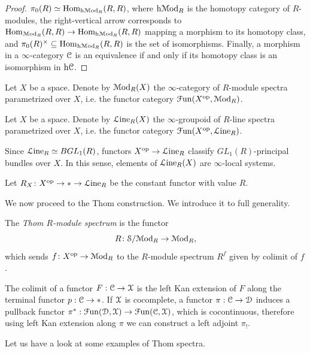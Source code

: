 \documentclass[10pt]{amsart}
\begin{document}
\begin{proof}
	$\pi_0(R)\simeq\mathrm{Hom}_{\mathrm{h}\mathcal{M}\mathrm{od}_R}(R,R)$, where $\mathrm{h}\mathcal{M}\mathrm{od}_R$ is the homotopy category of $R$-modules, the right-vertical arrow corresponds to $\mathrm{Hom}_{\mathcal{M}\mathrm{od}_R}(R,R)\to\mathrm{Hom}_{\mathrm{h}\mathcal{M}\mathrm{od}_R}(R,R)$ mapping a morphism to its homotopy class, and $\pi_0(R)^\times\subseteq\mathrm{Hom}_{\mathrm{h}\mathcal{M}\mathrm{od}_R}(R,R)$ is the set of isomorphisms. Finally, a morphism in a $\infty$-category $\mathcal{C}$ is an equivalence if and only if its homotopy class is an isomorphism in $\mathrm{h}\mathcal{C}$. 
\end{proof}
\begin{definition}
	Let $X$ be a space. Denote by $\mathcal{M}\mathrm{od}_R(X)$ the $\infty$-category of $R$-module spectra parametrized over $X$, i.e. the functor category $\mathcal{F}\mathrm{un}(X^{\mathrm{op}},\mathcal{M}\mathrm{od}_R)$.
\end{definition}

\begin{definition}
	Let $X$ be a space. Denote by $\mathcal{L}\mathrm{ine}_R(X)$ the $\infty$-groupoid of $R$-line spectra parametrized over $X$, i.e. the functor category $\mathcal{F}\mathrm{un}(X^{\mathrm{op}},\mathcal{L}\mathrm{ine}_R)$. 
\end{definition}
Since $\mathcal{L}\mathrm{ine}_R\simeq BGL_1(R)$, functors $X^{\mathrm{op}}\to\mathcal{L}\mathrm{ine}_R$ classify $GL_1(R)$-principal bundles over $X$. In this sense, elements of $\mathcal{L}\mathrm{ine}_R(X)$ are $\infty$-local systems. 
\begin{example}
	Let $R_X\colon X^{\mathrm{op}} \to*\to \mathcal{L}\mathrm{ine}_R$ be the constant functor with value $R$. 
\end{example}
We now proceed to the Thom construction. We introduce it to full generality. 
\begin{definition} \label{def:thom}
	The \emph{Thom $R$-module spectrum} is the functor
	\[
	R \colon \mathcal{S}/\mathcal{M}\mathrm{od}_R \to \mathcal{M}\mathrm{od}_R,
	\]
	which sends $f\colon X^{\mathrm{op}} \to \mathcal{M}\mathrm{od}_R$ to the $R$-module spectrum $R^f$ given by colimit of $f$. 
\end{definition}
\begin{remark}The colimit of a functor $F:\mathcal{C}\to\mathcal{X}$ is the left Kan extension of $F$ along the terminal functor $p:\mathcal{C}\to*$. If $\mathcal{X}$ is cocomplete, a functor $\pi:\mathcal{C}\to\mathcal{D}$ induces a pullback functor $\pi^*:\mathcal{F}\mathrm{un}(\mathcal{D},\mathcal{X})\to\mathcal{F}\mathrm{un}(\mathcal{C},\mathcal{X})$, which is cocontinuous, therefore using left Kan extension along $\pi$ we can construct a left adjoint $\pi_!$.  
\end{remark}
Let us have a look at some examples of Thom spectra. 
\end{document}
